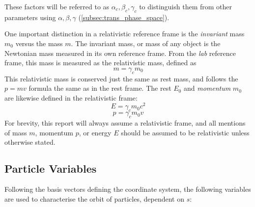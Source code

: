 \documentclass[11pt]{report}
\begin{document}
These factors will be referred to as $\alpha_c, \beta_c, \gamma_c$ to distinguish them from other parameters using $\alpha, \beta, \gamma$ (\autoref{subsec:trans_phase_space}).

One important distinction in a relativistic reference frame is the \textit{invariant} mass $m_0$ versus the  mass $m$. The invariant mass, or  mass of any object is the Newtonian mass measured in its own reference frame. From the \textit{lab} reference frame, this mass is measured as the relativistic mass, defined as
\begin{equation}
    m=\gamma_c m_0
\end{equation}
This relativistic mass is conserved just the same as rest mass, and follows the $p=mv$ formula the same as in the rest frame. 
The rest  $E_0$ and \textit{momentum} $m_0$ are likewise defined in the relativistic frame:
\begin{equation}
    E=\gamma_c m_0c^2
    \label{eq:relativistic_energy}
\end{equation}
\begin{equation}
    p=\gamma_c m_0v
    \label{eq:relativistic_momentum}
\end{equation}
For brevity, this report will always assume a relativistic frame, and all mentions of mass $m$, momentum $p$, or energy $E$ should be assumed to be relativistic unless otherwise stated.

\subsection{Particle Variables}

Following the basis vectors defining the coordinate system, the following variables are used to characterise the orbit of particles, dependent on $s$:
\end{document}
